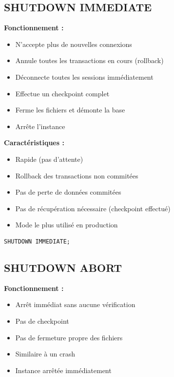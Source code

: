 \documentclass[11pt,a4paper]{article}
\begin{document}
\subsection{SHUTDOWN IMMEDIATE}

\textbf{Fonctionnement :}
\begin{itemize}
    \item N'accepte plus de nouvelles connexions
    \item Annule toutes les transactions en cours (rollback)
    \item Déconnecte toutes les sessions immédiatement
    \item Effectue un checkpoint complet
    \item Ferme les fichiers et démonte la base
    \item Arrête l'instance
\end{itemize}

\textbf{Caractéristiques :}
\begin{itemize}
    \item Rapide (pas d'attente)
    \item Rollback des transactions non commitées
    \item Pas de perte de données commitées
    \item Pas de récupération nécessaire (checkpoint effectué)
    \item Mode le plus utilisé en production
\end{itemize}

\begin{commandebox}
\begin{lstlisting}
SHUTDOWN IMMEDIATE;
\end{lstlisting}
\end{commandebox}

\subsection{SHUTDOWN ABORT}

\textbf{Fonctionnement :}
\begin{itemize}
    \item Arrêt immédiat sans aucune vérification
    \item Pas de checkpoint
    \item Pas de fermeture propre des fichiers
    \item Similaire à un crash
    \item Instance arrêtée immédiatement
\end{itemize}
\end{document}
